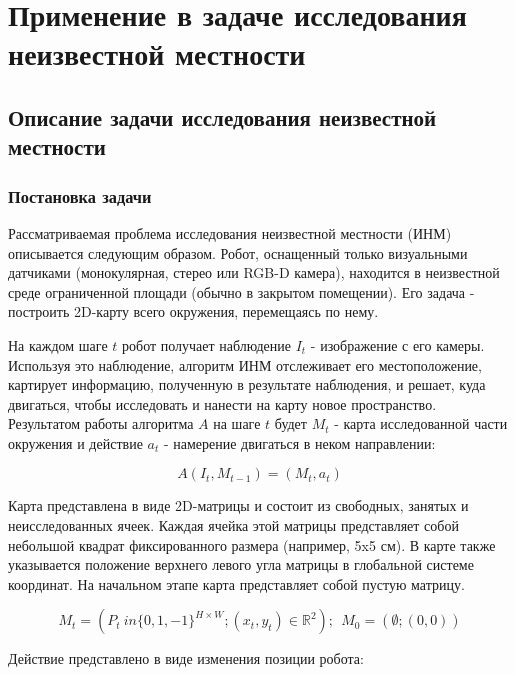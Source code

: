 \documentclass{mipt-thesis-ms}
\begin{document}
	
	\chapter{Применение в задаче исследования неизвестной местности}
	
	\section{Описание задачи исследования неизвестной местности}
	
	\subsection{Постановка задачи}
	
	Рассматриваемая проблема исследования неизвестной местности (ИНМ) описывается следующим образом. Робот, оснащенный только визуальными датчиками (монокулярная, стерео или RGB-D камера), находится в неизвестной среде ограниченной площади (обычно в закрытом помещении). Его задача - построить 2D-карту всего окружения, перемещаясь по нему.
	
	На каждом шаге $ t $ робот получает наблюдение $ I_t $ - изображение с его камеры. Используя это наблюдение, алгоритм ИНМ отслеживает его местоположение, картирует информацию, полученную в результате наблюдения, и решает, куда двигаться, чтобы исследовать и нанести на карту новое пространство. Результатом работы алгоритма $ A $ на шаге $ t $ будет $ M_t $ - карта исследованной части окружения и действие $ a_t $ - намерение двигаться в неком направлении:
	
	$$ A (I_t, M_ {t-1}) = (M_t, a_t) $$
	
	Карта представлена в виде 2D-матрицы и состоит из свободных, занятых и неисследованных ячеек. Каждая ячейка этой матрицы представляет собой небольшой квадрат фиксированного размера (например, 5x5 см). В карте также указывается положение верхнего левого угла матрицы в глобальной системе координат. На начальном этапе карта представляет собой пустую матрицу.
	
	$$ M_t = (P_t \ in \{0, 1, -1 \} ^ {H \times W}; (x_t, y_t) \in \mathbb {R} ^ 2); \ \ M_0 = (\emptyset; (0, 0)) $$
	
	Действие представлено в виде изменения позиции робота:
	
\end{document}
